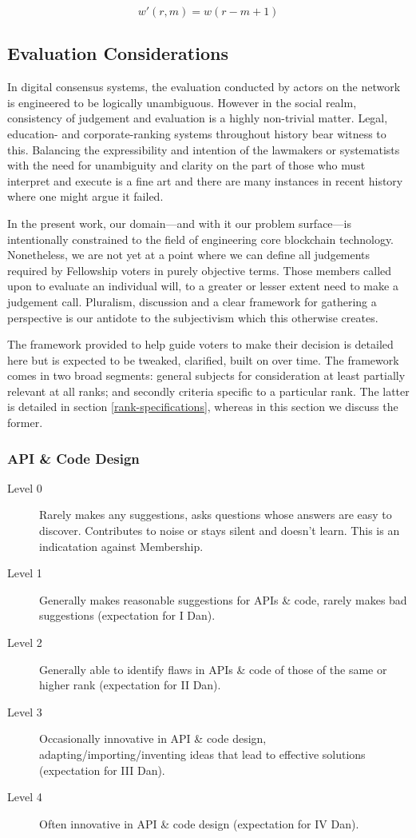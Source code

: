 \documentclass[9pt,oneside]{amsart}
\begin{document}
\begin{equation}
  w'(r, m) = w(r - m + 1) 
\end{equation}

\subsection{Evaluation Considerations}

In digital consensus systems, the evaluation conducted by actors on the network is engineered to be logically unambiguous. However in the social realm, consistency of judgement and evaluation is a highly non-trivial matter. Legal, education- and corporate-ranking systems throughout history bear witness to this. Balancing the expressibility and intention of the lawmakers or systematists with the need for unambiguity and clarity on the part of those who must interpret and execute is a fine art and there are many instances in recent history where one might argue it failed.

In the present work, our domain---and with it our problem surface---is intentionally constrained to the field of engineering core blockchain technology. Nonetheless, we are not yet at a point where we can define all judgements required by Fellowship voters in purely objective terms. Those members called upon to evaluate an individual will, to a greater or lesser extent need to make a judgement call. Pluralism, discussion and a clear framework for gathering a perspective is our antidote to the subjectivism which this otherwise creates.

The framework provided to help guide voters to make their decision is detailed here but is expected to be tweaked, clarified, built on over time. The framework comes in two broad segments: general subjects for consideration at least partially relevant at all ranks; and secondly criteria specific to a particular rank. The latter is detailed in section \ref{rank-specifications}, whereas in this section we discuss the former.

\subsubsection{API \& Code Design}

\begin{description}
  \item[Level 0] Rarely makes any suggestions, asks questions whose answers are easy to discover. Contributes to noise or stays silent and doesn't learn. This is an indicatation against Membership.
  \item[Level 1] Generally makes reasonable suggestions for APIs \& code, rarely makes bad suggestions (expectation for I Dan).
  \item[Level 2] Generally able to identify flaws in APIs \& code of those of the same or higher rank (expectation for II Dan).
  \item[Level 3] Occasionally innovative in API \& code design, adapting/importing/inventing ideas that lead to effective solutions (expectation for III Dan).
  \item[Level 4] Often innovative in API \& code design (expectation for IV Dan).
\end{description}
\end{document}
